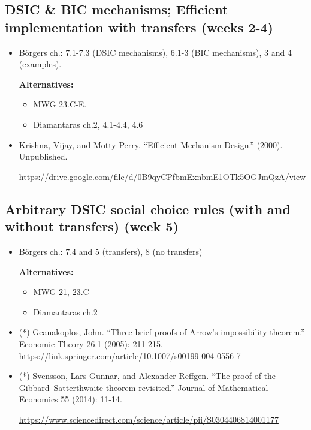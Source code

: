 \documentclass{article}
\begin{document}
\subsection{DSIC \& BIC mechanisms; Efficient implementation with transfers (weeks 2-4)}
\begin{itemize}
	\item B{\"o}rgers ch.: 7.1-7.3 (DSIC mechanisms), 6.1-3 (BIC mechanisms), 3 and 4 (examples).
	
	\textbf{Alternatives:}
	\begin{itemize}
		\item MWG 23.C-E.
		\item Diamantaras ch.2, 4.1-4.4, 4.6
	\end{itemize}
	\item Krishna, Vijay, and Motty Perry. ``Efficient Mechanism Design.'' (2000). Unpublished.
	
	\url{https://drive.google.com/file/d/0B9qyCPfbmExnbmE1OTk5OGJmQzA/view}
\end{itemize}

\subsection{Arbitrary DSIC social choice rules (with and without transfers) (week 5)}
\begin{itemize}
	\item B{\"o}rgers ch.: 7.4 and 5 (transfers), 8 (no transfers)
	
	\textbf{Alternatives:}
	\begin{itemize}
		\item MWG 21, 23.C
		\item Diamantaras ch.2
	\end{itemize}
	\item (*) Geanakoplos, John. ``Three brief proofs of Arrow’s impossibility theorem.'' Economic Theory 26.1 (2005): 211-215. \url{https://link.springer.com/article/10.1007/s00199-004-0556-7}
	\item (*) Svensson, Lars-Gunnar, and Alexander Reffgen. ``The proof of the Gibbard–Satterthwaite theorem revisited.'' Journal of Mathematical Economics 55 (2014): 11-14.
	
	\url{https://www.sciencedirect.com/science/article/pii/S0304406814001177}
\end{itemize}
\end{document}
